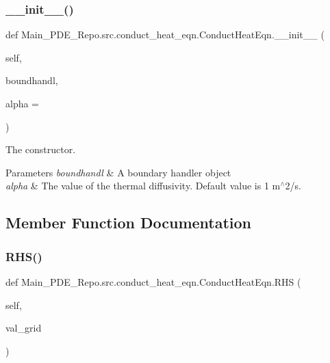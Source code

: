 \subsubsection{\texorpdfstring{\+\_\+\+\_\+init\+\_\+\+\_\+()}{\_\_init\_\_()}}
{\footnotesize\ttfamily def Main\+\_\+\+P\+D\+E\+\_\+\+Repo.\+src.\+conduct\+\_\+heat\+\_\+eqn.\+Conduct\+Heat\+Eqn.\+\_\+\+\_\+init\+\_\+\+\_\+ (\begin{DoxyParamCaption}\item[{}]{self,  }\item[{}]{boundhandl,  }\item[{}]{alpha = {} }\end{DoxyParamCaption})}



The constructor. 


\begin{DoxyParams}{Parameters}
{\em boundhandl} & A boundary handler object \\
\hline
{\em alpha} & The value of the thermal diffusivity. Default value is 1 m$^\wedge$2/s. \\
\hline
\end{DoxyParams}


\subsection{Member Function Documentation}
\mbox{\label{classMain__PDE__Repo_1_1src_1_1conduct__heat__eqn_1_1ConductHeatEqn_a5889ab024d0a42bf84a00c1c156a19a9}} 
\subsubsection{\texorpdfstring{R\+H\+S()}{RHS()}}
{\footnotesize\ttfamily def Main\+\_\+\+P\+D\+E\+\_\+\+Repo.\+src.\+conduct\+\_\+heat\+\_\+eqn.\+Conduct\+Heat\+Eqn.\+R\+HS (\begin{DoxyParamCaption}\item[{}]{self,  }\item[{}]{val\+\_\+grid }\end{DoxyParamCaption})}



